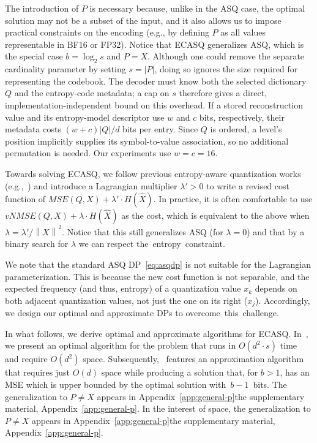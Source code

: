 \documentclass[11pt,letterpaper]{article}
\newcommand{\norm}[1]{\left\lVert#1\right\rVert}
\newcommand{\ran}[1]{\textcolor{red}{Ran:~#1}}
\newcommand{\MM}[1]{\textcolor{purple}{MM:~#1}}
\newcommand{\ran}[1]{}
\newcommand{\MM}[1]{}
\newcommand{\appendixlocation}[1]{\ifarxiv Appendix~\ref{#1}\else the supplementary material, Appendix~\ref{#1}\fi}
\begin{document}
The introduction of $P$ is necessary because, unlike in the ASQ case, the optimal solution may not be a subset of the input, and it also allows us to impose practical constraints on the encoding (e.g., by defining $P$ as all values representable in BF16 or FP32).
Notice that ECASQ generalizes ASQ, which is the special case $b=\log_2 s$ and $P=X$. Although one could remove the separate cardinality parameter by setting $s=|P|$, doing so ignores the size required for representing the codebook. The decoder must know both the selected dictionary $Q$ and the entropy-code metadata; a cap on $s$ therefore gives a direct, implementation-independent bound on this overhead. 
If a stored reconstruction value and its entropy-model descriptor use $w$ and
$c$ bits, respectively, their metadata costs $(w+c)\lvert Q\rvert/d$ bits per
entry.  Since $Q$ is ordered, a level's position implicitly supplies its
symbol-to-value association, so no additional permutation is needed.  Our
experiments use $w=c=16$.

Towards solving ECASQ, we follow previous entropy-aware quantization works (e.g.,~\cite{chou1989entropy}) and introduce a Lagrangian multiplier $\lambda'>0$ to write a revised cost function of 
$MSE(Q,X) + \lambda'\cdot H(\widehat X)$.
In practice, it is often comfortable to use 
$vNMSE(Q,X) + \lambda\cdot H(\widehat X)$ as the cost, which is equivalent to the above when $\lambda = \lambda' / \norm{X}^2$. Notice that this still generalizes ASQ (for $\lambda=0$) and that by a binary search for $\lambda$ we can respect \mbox{the entropy constraint.}

We note that the standard ASQ DP~\eqref{eq:asqdp} is not suitable for the Lagrangian parameterization. This is because the new cost function is not separable, and the expected frequency (and thus, entropy) of a quantization value $x_k$ depends on both adjacent quantization values, not just the one on its right ($x_j$).
Accordingly, we design our optimal and approximate DPs to \mbox{overcome this challenge.}

In what follows, we derive optimal and approximate algorithms for ECASQ. In~, we present an optimal algorithm for the problem that runs in $O(d^2\cdot s)$ time and require $O(d^2)$ space.
Subsequently,~ features an approximation algorithm that requires just $O(d)$ space while producing a solution that, for $b>1$, has an MSE which is upper bounded by the optimal solution \mbox{with $b-1$ bits.}
\ifarxiv
The generalization to $P\neq X$ appears in \appendixlocation{app:general-p}.
\else
In the interest of space, the generalization to $P\neq X$ appears in \appendixlocation{app:general-p}.
\fi
\end{document}
